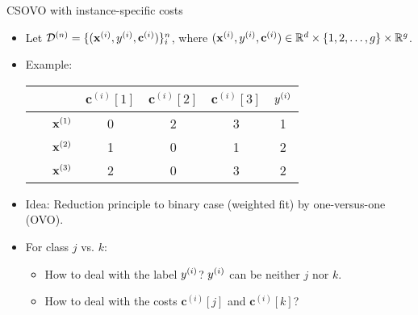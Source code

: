 \documentclass[11pt,compress,t,notes=noshow, xcolor=table]{beamer}
\newcommand{\cv}{\mathbf{c}}    %
\begin{document}
\begin{vbframe}{CSOVO with instance-specific costs}
    \footnotesize
    \begin{itemize}
        \footnotesize

        \item Let $\D^{(n)} = \{(\xi, \yi, \cv^{(i)})\}_i^n$, where $(\xi, \yi, \cv^{(i)}) \in \mathbb{R}^d \times \{1, 2, \ldots, g\} \times \mathbb{R}^g$. 
        \vspace{5pt}    
        \item Example:
        \vspace{5pt}

                        \begin{center}
                            \begin{tabular}{cc|cccc}\
        			& & $\cv^{(i)}[1]$ & $\cv^{(i)}[2]$ & $\cv^{(i)}[3]$ & $y^{(i)}$ \\
        			\hline & $\mathbf{x}^{(1)}$ & 0 & 2 & 3 & 1\\
        			& $\mathbf{x}^{(2)}$ & 1 & 0 & 1 & 2\\
                 	& $\mathbf{x}^{(3)}$ & 2 & 0 & 3 & 2\\
                \end{tabular}
        \end{center}
        
        \vspace{5pt}
        \vspace{5pt}
        
        \item Idea: Reduction principle to binary case (weighted fit) by one-versus-one (OVO). 
        
        \vspace{5pt}
        
        \item For class $j$ vs. $k$:
        \begin{itemize}
            \footnotesize
            \item How to deal with the label $y^{(i)}$? $y^{(i)}$ can be neither $j$ nor $k$.
            \vspace{5pt}
            
            \item How to deal with the costs $\cv^{(i)}[j]$ and $\cv^{(i)}[k]$?
        \end{itemize}
            
    \end{itemize}
\end{vbframe}
\end{document}

